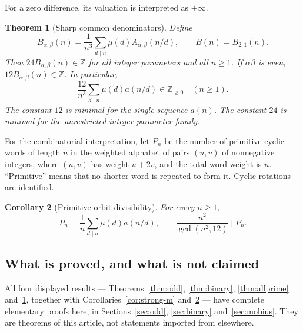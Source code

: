 \documentclass[11pt,a4paper]{article}
\numberwithin{equation}{section}
\newtheorem{theorem}{Theorem}[section]
\newtheorem{corollary}[theorem]{Corollary}
\theoremstyle{definition}
\theoremstyle{remark}
\newcommand{\Z}{\mathbb Z}
\newcommand{\A}{A_{\alpha,\beta}}
\newcommand{\B}{B_{\alpha,\beta}}
\begin{document}
For a zero difference, its valuation is interpreted as $+\infty$.

\begin{theorem}[Sharp common denominators]\label{thm:denom}
Define
\begin{equation}\label{eq:Bn}
 \B(n)=\frac1{n^3}\sum_{d\mid n}\mu(d)\A(n/d),\qquad
 B(n)=B_{2,1}(n).
\end{equation}
Then $24\B(n)\in\Z$ for all integer parameters and all $n\ge1$.
If $\alpha\beta$ is even, $12\B(n)\in\Z$. In particular,
\begin{equation}\label{eq:denom12}
 \boxed{\quad
 \frac{12}{n^3}\sum_{d\mid n}\mu(d)a(n/d)\in\Z_{\ge0}
 \quad(n\ge1).\quad}
\end{equation}
The constant $12$ is minimal for the single sequence $a(n)$. The constant
$24$ is minimal for the unrestricted integer-parameter family.
\end{theorem}

For the combinatorial interpretation, let $P_n$ be the number of primitive
cyclic words of length $n$ in the weighted alphabet of pairs $(u,v)$ of
nonnegative integers, where $(u,v)$ has weight $u+2v$, and the total word
weight is $n$. ``Primitive'' means that no shorter word is repeated to form
it. Cyclic rotations are identified.

\begin{corollary}[Primitive-orbit divisibility]\label{cor:necklace}
For every $n\ge1$,
\begin{equation}\label{eq:necklace-div}
 P_n=\frac1n\sum_{d\mid n}\mu(d)a(n/d),\qquad
 \frac{n^2}{\gcd(n^2,12)}\mid P_n.
\end{equation}
\end{corollary}

\subsection{What is proved, and what is not claimed}
All four displayed results --- Theorems~\ref{thm:odd}, \ref{thm:binary},
\ref{thm:allprime} and~\ref{thm:denom}, together with
Corollaries~\ref{cor:strong-m} and~\ref{cor:necklace} --- have complete
elementary proofs here, in Sections~\ref{sec:odd}, \ref{sec:binary}
and~\ref{sec:mobius}. They are theorems of this article, not statements
imported from elsewhere.
\end{document}
